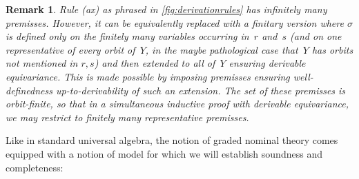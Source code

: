 \documentclass[11pt,a4paper]{amsart}
\newtheorem{remark}[remark]{Remark}
\newcommand{\sigf}{\Sigma_{\mathsf f}}
\newcommand{\sigb}{\Sigma_{\mathsf b}}
\newcommand{\fresh}{\mathbin{\#}}
\theoremstyle{plain}
\numberwithin{equation}{section}
\newcommand{\+}[1]{\mathcal{#1}\xspace}
\theoremstyle{definition}
\begin{document}
\begin{remark}\label{rem:ax}
  Rule (ax) as phrased in \cref{fig:derivationrules} has infinitely
  many premisses. However, it can be equivalently replaced with a
  finitary version where $\sigma$ is defined only on the finitely many
  variables occurring in~$r$ and~$s$ (and on one representative of
  every orbit of~$Y$, in the maybe pathological case that~$Y$ has
  orbits not mentioned in $r,s$) and then extended to all of~$Y$
  ensuring derivable equivariance. This is made possible by imposing
  premisses ensuring well-definedness up-to-derivability of such an
  extension. The set of these premisses is orbit-finite, so that in a
  simultaneous inductive proof with derivable equivariance,
  we may restrict to finitely many representative premisses.
\end{remark}
\noindent Like in standard universal algebra, the notion of graded
nominal theory comes equipped with a notion of model for which we will
establish soundness and completeness:
\end{document}
